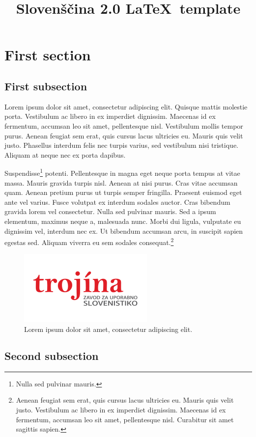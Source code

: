 \documentclass[slovene,georgia]{slo20}
\affiliation{%
Magic and Macaroons Lab, University of Southern Atlantis\\
The Republic, Utopia}
\affiliation{%
ACME Research Group, University of Entenhausen\\
Entenhausen, Germany}
\title{Slovenščina 2.0 \LaTeX\ template}
\begin{document}
\section{First section}

\subsection{First subsection}

Lorem ipsum dolor sit amet, consectetur adipiscing elit. Quisque mattis
molestie porta. Vestibulum ac libero in ex imperdiet dignissim. Maecenas
id ex fermentum, accumsan leo sit amet, pellentesque nisl. Vestibulum
mollis tempor purus. Aenean feugiat sem erat, quis cursus lacus ultricies
eu. Mauris quis velit justo. Phasellus interdum felis nec turpis varius,
sed vestibulum nisi tristique. Aliquam at neque nec ex porta dapibus.

Suspendisse\footnote{ Nulla sed pulvinar mauris.} potenti. Pellentesque in
magna eget neque porta tempus at vitae massa. Mauris gravida turpis nisl.
Aenean at nisi purus. Cras vitae accumsan quam. Aenean pretium purus ut
turpis semper fringilla. Praesent euismod eget ante vel varius. Fusce
volutpat ex interdum sodales auctor.  Cras bibendum gravida lorem vel
consectetur. Nulla sed pulvinar mauris.  Sed a ipsum elementum, maximus
neque a, malesuada nunc. Morbi dui ligula, vulputate eu dignissim vel,
interdum nec ex. Ut bibendum accumsan arcu, in suscipit sapien egestas
sed. Aliquam viverra eu sem sodales consequat.\footnote{Aenean feugiat sem
erat, quis cursus lacus ultricies eu. Mauris quis velit justo. Vestibulum
ac libero in ex imperdiet dignissim. Maecenas id ex fermentum, accumsan
leo sit amet, pellentesque nisl. Curabitur sit amet sagittis sapien.}

\begin{figure}
\centering
\includegraphics[scale=0.75]{trojina}
\caption{%
Lorem ipsum dolor sit amet, consectetur adipiscing elit.}
\end{figure}

\subsection{Second subsection}
\end{document}
